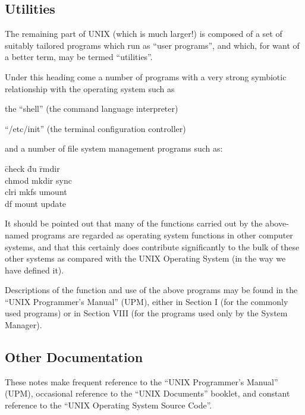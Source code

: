 \subsection{Utilities}

The remaining part of UNIX (which is
much larger!) is composed of a set of
suitably tailored programs which run as
``user programs'', and which, for want of
a better term, may be termed ``utilities''.

Under this heading come a number of
programs with a very strong symbiotic
relationship with the operating system
such as

\bi
\item the ``shell'' (the command language interpreter)

\item ``/etc/init'' (the terminal configuration controller)
\ei

\noindent and a number of file system management
programs such as:

\bt
\hspace{1cm} \= check \hspace{1cm} \= du \hspace{1.5cm} \= rmdir \\
\> chmod \> mkdir \> sync \\
\> clri \> mkfs \> umount \\
\> df \> mount \> update \\
\et

It should be pointed out that many of
the functions carried out by the
above-named programs are regarded as
operating system functions in other
computer systems, and that this certainly
does contribute significantly to
the bulk of these other systems as
compared with the UNIX Operating System
(in the way we have defined it).


Descriptions of the function and use of
the above programs may be found in the
``UNIX Programmer's Manual'' (UPM),
either in Section I (for the commonly
used programs) or in Section VIII (for
the programs used only by the System
Manager).


\subsection{Other Documentation}

These notes make frequent reference to
the ``UNIX Programmer's Manual'' (UPM),
occasional reference to the ``UNIX
Documents'' booklet, and constant
reference to the ``UNIX Operating System
Source Code''.

